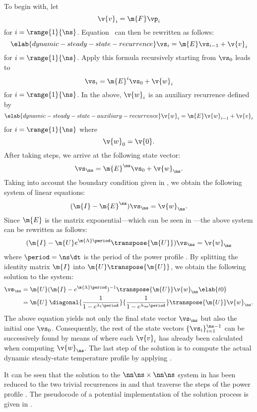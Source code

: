 To begin with, let
\[
  \v{v}_i = \m{F} \vp_i
\]
for $i = \range{1}{\ns}$. Equation~ can then be
rewritten as follows:
\begin{equation} \elab{dynamic-steady-state-recurrence}
  \vs_i = \m{E} \vs_{i - 1} + \v{v}_i
\end{equation}
for $i = \range{1}{\ns}$. Apply this formula recursively starting from $\vs_0$
leads to
\[
  \vs_i = \m{E}^i \vs_0 + \v{w}_i
\]
for $i = \range{1}{\ns}$. In the above, $\v{w}_i$ is an auxiliary recurrence
defined by
\begin{equation} \elab{dynamic-steady-state-auxiliary-recurrence}
  \v{w}_i = \m{E} \v{w}_{i - 1} + \v{v}_i
\end{equation}
for $i = \range{1}{\ns}$ where
\[
  \v{w}_0 = \v{0}.
\]
After taking \ns steps, we arrive at the following state vector:
\[
  \vs_\ns = \m{E}^\ns \vs_0 + \v{w}_\ns.
\]
Taking into account the boundary condition given in
, we obtain the following system of linear
equations:
\[
  (\m{I} - \m{E}^\ns) \vs_\ns = \v{w}_\ns.
\]
Since $\m{E}$ is the matrix exponential---which can be seen in
---the above system can be rewritten as follows:
\[
  (\m{I} - \m{U} e^{\m{\Lambda} \period} \transpose{\m{U}}) \vs_\ns = \v{w}_\ns
\]
where $\period = \ns \dt$ is the period of the power profile \mp. By splitting
the identity matrix $\m{I}$ into $\m{U} \transpose{\m{U}}$, we obtain the
following solution to the system:
\begin{align}
  \vs_\ns
  & = \m{U} (\m{I} - e^{\m{\Lambda} \period})^{-1} \transpose{\m{U}} \v{w}_\ns \elab{t0} \\
  & = \m{U} \: \diagonal{\frac{1}{1 - e^{\lambda_1 \period}}}{\frac{1}{1 - e^{\lambda_\ns \period}}} \transpose{\m{U}} \v{w}_\ns. \nonumber
\end{align}
The above equation yields not only the final state vector $\vs_\ns$ but also the
initial one $\vs_0$. Consequently, the rest of the state vectors $\{ \vs_i \}_{i
= 1}^{\ns - 1}$ can be successively found by means of
 where each $\v{v}_i$ has already been
calculated when computing $\v{w}_\ns$. The last step of the solution is to
compute the actual dynamic steady-state temperature profile \mq by applying
.

It can be seen that the solution to the $\nn \ns \times \nn \ns$ system in
 has been reduced to the two trivial
recurrences in  and
 that traverse the \ns steps of
the power profile \mp. The pseudocode of a potential implementation of the
solution process is given in .

